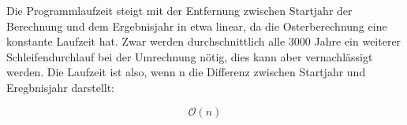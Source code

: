 Die Programmlaufzeit steigt mit der Entfernung zwischen Startjahr der Berechnung und dem Ergebnisjahr in etwa linear, da die Osterberechnung eine konstante Laufzeit hat. Zwar werden durchschnittlich alle 3000 Jahre ein weiterer Schleifendurchlauf bei der Umrechnung nötig, dies kann aber vernachlässigt werden. Die Laufzeit ist also, wenn n die Differenz zwischen Startjahr und Eregbnisjahr darstellt:

\[\mathcal O(n)\]